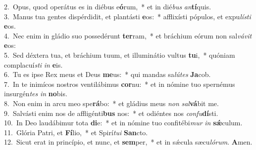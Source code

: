 {2.~}Opus, quod operátus es in diébus e\textbf{ó}rum,~* et in dié\textit{bus} \textit{an}\textbf{tí}quis.\\
{3.~}Manus tua gentes dispérdidit, et plantásti \textbf{e}os:~* afflixísti pópulos, et expu\textit{lí}\textit{sti} \textbf{e}os.\\
{4.~}Nec enim in gládio suo possedérunt \textbf{ter}ram,~* et bráchium eórum non sal\textit{vá}\textit{vit} \textbf{e}os:\\
{5.~}Sed déxtera tua, et bráchium tuum, et illuminátio vultus \textbf{tu}i,~* quóniam complacuí\textit{sti} \textit{in} \textbf{e}is.\\
{6.~}Tu es ipse Rex meus et Deus \textbf{me}us:~* qui mandas sa\textit{lú}\textit{tes} \textbf{Ja}cob.\\
{7.~}In te inimícos nostros ventilábimus \textbf{cor}nu:~* et in nómine tuo spernémus insurgén\textit{tes} \textit{in} \textbf{no}bis.\\
{8.~}Non enim in arcu meo spe\textbf{rá}bo:~* et gládius meus \textit{non} \textit{sal}\textbf{vá}bit me.\\
{9.~}Salvásti enim nos de affligénti\textbf{bus} nos:~* et odiéntes nos \textit{con}\textit{fu}\textbf{dí}sti.\\
{10.~}In Deo laudábimur tota \textbf{di}e:~* et in nómine tuo confitébi\textit{mur} \textit{in} \textbf{sǽ}culum.\\
{11.~}Glória Patri, et \textbf{Fí}lio,~* et Spirí\textit{tu}\textit{i} \textbf{San}cto.\\
{12.~}Sicut erat in princípio, et nunc, et \textbf{sem}per,~* et in sǽcula sæcu\textit{ló}\textit{rum}. \textbf{A}men.\\

